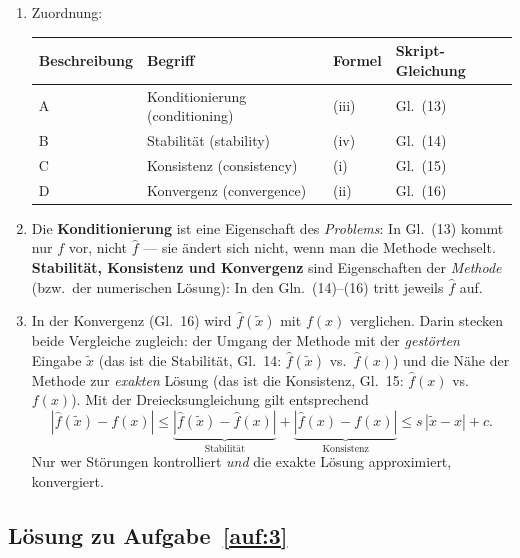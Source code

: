 \documentclass[a4paper,11pt]{scrartcl}
\begin{document}
\begin{enumerate}[label=(\alph*)]
  \item Zuordnung:
  \begin{center}
  \begin{tabular}{llll}
  \toprule
  Beschreibung & Begriff & Formel & Skript-Gleichung \\
  \midrule
  A & Konditionierung (conditioning) & (iii) & Gl.~(13) \\
  B & Stabilität (stability) & (iv) & Gl.~(14) \\
  C & Konsistenz (consistency) & (i) & Gl.~(15) \\
  D & Konvergenz (convergence) & (ii) & Gl.~(16) \\
  \bottomrule
  \end{tabular}
  \end{center}
  \item Die \textbf{Konditionierung} ist eine Eigenschaft des \emph{Problems}: In Gl.~(13) kommt nur $f$ vor, nicht $\hat{f}$ --- sie ändert sich nicht, wenn man die Methode wechselt. \textbf{Stabilität, Konsistenz und Konvergenz} sind Eigenschaften der \emph{Methode} (bzw.\ der numerischen Lösung): In den Gln.~(14)--(16) tritt jeweils $\hat{f}$ auf.
  \item In der Konvergenz (Gl.~16) wird $\hat{f}(\tilde{x})$ mit $f(x)$ verglichen. Darin stecken beide Vergleiche zugleich: der Umgang der Methode mit der \emph{gestörten} Eingabe $\tilde{x}$ (das ist die Stabilität, Gl.~14: $\hat{f}(\tilde{x})$ vs.\ $\hat{f}(x)$) und die Nähe der Methode zur \emph{exakten} Lösung (das ist die Konsistenz, Gl.~15: $\hat{f}(x)$ vs.\ $f(x)$). Mit der Dreiecksungleichung gilt entsprechend
  \[ \left|\hat{f}(\tilde{x}) - f(x)\right| \leq \underbrace{\left|\hat{f}(\tilde{x}) - \hat{f}(x)\right|}_{\text{Stabilität}} + \underbrace{\left|\hat{f}(x) - f(x)\right|}_{\text{Konsistenz}} \leq s\,|\tilde{x} - x| + c. \]
  Nur wer Störungen kontrolliert \emph{und} die exakte Lösung approximiert, konvergiert.
\end{enumerate}

\subsection*{Lösung zu Aufgabe~\ref{auf:3}}
\end{document}
